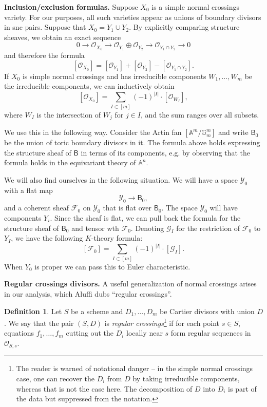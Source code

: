 \documentclass[11pt]{amsart}
\theoremstyle{definition}
\theoremstyle{definition}
\newtheorem{definition}[theorem]{Definition}
\begin{document}
\noindent
{\bf Inclusion/exclusion formulas.} Suppose $X_0$ is a simple normal crossings variety. For our purposes, all such varieties appear as unions of boundary divisors in snc pairs. Suppose that $X_0 = Y_1\cup Y_2$. By explicitly comparing structure sheaves, we obtain an exact sequence
\[
0\to \mathcal O_{X_0}\to\mathcal O_{Y_1}\oplus\mathcal O_{Y_2}\to \mathcal O_{Y_1\cap Y_2}\to 0
\]
and therefore the formula
\[
[\mathcal O_{X_0}] = [\mathcal O_{Y_1}]+[\mathcal O_{Y_2}]-[\mathcal O_{Y_1\cap Y_2}].
\]
If $X_0$ is simple normal crossings and has irreducible components $W_1,\ldots, W_m$ be the irreducible components, we can inductively obtain
\[
[\mathcal O_{X_0}] = \sum_{I\subset [m]} (-1)^{|I|} \cdot [\mathcal O_{W_I}],
\]
where $W_I$ is the intersection of $W_j$ for $j\in I$, and the sum ranges over all subsets. 

We use this in the following way. Consider the Artin fan $[\mathbb A^m/\mathbb G_m^m]$ and write $\mathsf B_0$ be the union of toric boundary divisors in it. The formula above holds expressing the structure sheaf of $\mathsf B$ in terms of its components, e.g. by observing that the formula holds in the equivariant theory of $\mathbb A^n$. 

We will also find ourselves in the following situation. We will have a space $\mathcal Y_0$ with a flat map
\[
\mathcal Y_0\to \mathsf B_0,
\]
and a coherent sheaf $\mathcal F_0$ on $\mathcal Y_0$ that is flat over $\mathsf B_0$. The space $\mathcal Y_0$  will have components $Y_i$. Since the sheaf is flat, we can pull back the formula for the structure sheaf of $\mathsf B_0$ and tensor wth $\mathcal F_0$. Denoting $\mathcal G_I$ for the restriction of $\mathcal F_0$ to $Y_I$, we have the following $K$-theory formula:
\[
[\mathcal F_0]= \sum_{I\subset [m]} (-1)^{|I|} \cdot [\mathcal G_I].
\]
When $Y_0$ is proper we can pass this to Euler characteristic. 

\noindent
{\bf Regular crossings divisors.} A useful generalization of normal crossings arises in our analysis, which Aluffi dubs ``regular crossings''.

\begin{definition}
Let $S$ be a scheme and $D_1,\ldots,D_m$ be Cartier divisors with union $D$. We say that the pair $(S,D)$ is {\it regular crossings}\footnote{The reader is warned of notational danger -- in the simple normal crossings case, one can recover the $D_i$ from $D$ by taking irreducible components, whereas that is not the case here. The decomposition of $D$ into $D_i$ is part of the data but suppressed from the notation.} if for each point $s\in S$, equations $f_1,\ldots,f_m$ cutting out the $D_i$ locally near $s$ form regular sequences in $\mathcal O_{S,s}$. 
\end{definition}
\end{document}
